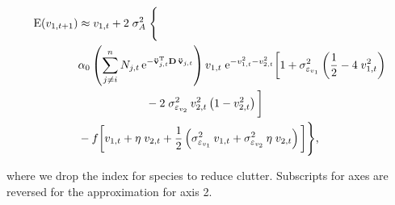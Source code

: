 \begin{equation}
\label{eq:taylor-expansion-final}
\begin{split}
    \text{E}(v_{1,t+1}) & \approx
        v_{1,t} + 2 \; \sigma_A^2 \; \Bigg\{ \\
            & \alpha_0
            \left(
                \sum_{j \ne i}^{n}{ N_{j,t} \, \textrm{e}^{
                    - \mathbf{\ddot{v}}_{j,t}^{\textrm{T}}
                    \mathbf{D} \, \mathbf{\ddot{v}}_{j,t} } }
            \right)
            v_{1,t} \; \text{e}^{-v_{1,t}^2 - v_{2,t}^2} 
            \bigg[ 
                1 + \sigma^2_{\varepsilon_{v_1}} \left( \frac{1}{2} - 4 \; v_{1,t}^2 \right) \\
                & \hspace*{6em} - 2 \; \sigma^2_{\varepsilon_{v_2}} \, v_{2,t}^2 \left( 1 - v_{2,t}^2 \right)
            \bigg] \\
            & - f \bigg[
                v_{1,t} + \eta \; v_{2,t} + \frac{1}{2} \left(
                    \sigma^2_{\varepsilon_{v_1}} \, v_{1,t} + \sigma^2_{\varepsilon_{v_2}} \, \eta \; v_{2,t}
                \right)
            \bigg]
        \Bigg\}
\text{,}
\end{split}
\end{equation}

where we drop the index for species to reduce clutter.
Subscripts for axes are reversed for the approximation for axis 2.


